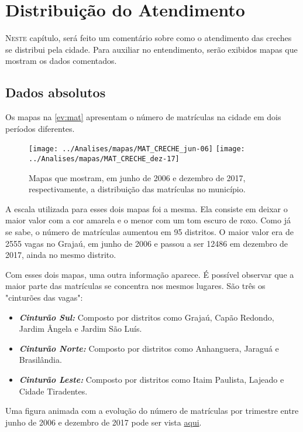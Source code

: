 \chapter{Distribuição do Atendimento}
\label{cap:distribuicao}

\lettrine{N}{este} capítulo, será feito um comentário sobre como o atendimento das creches se distribui pela cidade. Para auxiliar no entendimento, serão exibidos mapas que mostram os dados comentados.

\section{Dados absolutos}

Os mapas na \autoref{ev:mat} apresentam o número de matrículas na cidade em dois períodos diferentes.

\begin{figure}[H]
	\centering
	\texttt{[image: ../Analises/mapas/MAT\_CRECHE\_jun-06]}
	\texttt{[image: ../Analises/mapas/MAT\_CRECHE\_dez-17]}
	\caption{Mapas que mostram, em junho de 2006 e dezembro de 2017, respectivamente, a distribuição das matrículas no município.}
	\label{ev:mat}
\end{figure}

A escala utilizada para esses dois mapas foi a mesma. Ela consiste em deixar o maior valor com a cor amarela e o menor com um tom escuro de roxo. Como já se sabe, o número de matrículas aumentou em 95 distritos. O maior valor era de 2555 vagas no Grajaú, em junho de 2006 e passou a ser 12486 em dezembro de 2017, ainda no mesmo distrito.

Com esses dois mapas, uma outra informação aparece. É possível observar que a maior parte das matrículas se concentra nos mesmos lugares. São três os "cinturões das vagas": 

\begin{itemize}
	\item \textit{\textbf{Cinturão Sul:}} Composto por distritos como Grajaú, Capão Redondo, Jardim Ângela e Jardim São Luís.
	\item \textit{\textbf{Cinturão Norte:}} Composto por distritos como Anhanguera, Jaraguá e Brasilândia.
	\item \textit{\textbf{Cinturão Leste:}} Composto por distritos como Itaim Paulista, Lajeado e Cidade Tiradentes.
\end{itemize}

Uma figura animada com a evolução do número de matrículas por trimestre entre junho de 2006 e dezembro de 2017 pode ser vista \href{https://lsflp.github.io/MAC0213/multimidia/MAT_CRECHE.gif}{aqui}.

